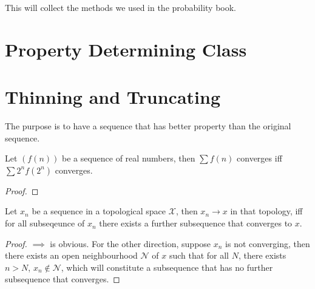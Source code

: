 This will collect the methods we used in the probability book.

\section{Property Determining Class}

\begin{method}
    
\end{method}

\begin{method}
    
\end{method}

\begin{method}
    
\end{method}


\begin{method}
    
\end{method}

\begin{method}
    
\end{method}

\section{Thinning and Truncating}

The purpose is to have a sequence that has better property than the original sequence. 

\begin{method}
    Let \((f(n))\) be a sequence of real numbers, then \(\sum f(n)\) converges iff \(\sum 2^{n} f(2^{n})\) converges.
\end{method}
\begin{proof}
    
\end{proof}

\begin{method}\label{method:thin-topology}
    Let \(x_{n}\) be a sequence in a topological space \(\mathcal{X}\), then \(x_{n} \to x\) in that topology, iff for all subseqeunce of \(x_{n}\) there exists a further subsequence that converges to \(x\).
\end{method}
\begin{proof}
    \(\implies\) is obvious. For the other direction, suppose \(x_{n}\) is not converging, then there exists an open neighbourhood \(\mathcal{N}\) of \(x\) such that for all \(N\), there exists \(n>N\), \(x_{n} \notin \mathcal{N}\), which will constitute a subsequence that has no further subsequence that converges.
\end{proof}


